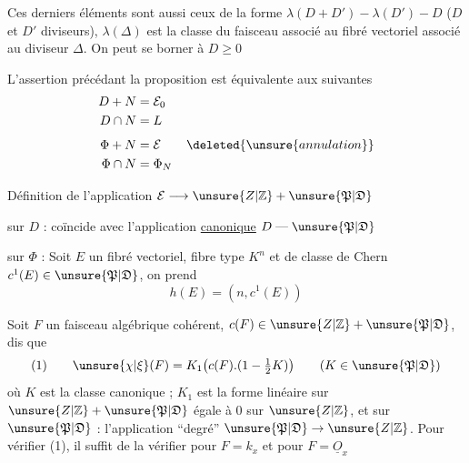 Ces derniers éléments sont aussi ceux de la forme
$\lambda(D+D')-\lambda(D')-D$ 
($D$ et $D'$ diviseurs),
$\lambda(\Delta)$ est la classe du faisceau associé au fibré vectoriel associé au diviseur $\Delta$.
On peut se borner à $D\geq0$



L'assertion précédant la proposition est équivalente aux suivantes
\[
\begin{aligned}
D+N&=\mathcal E_0\\
D\cap N&=L\\[4pt]
\Phi+N&=\mathcal E\qquad\deleted{\unsure{annulation}}\\
\Phi\cap N&=\Phi_N
\end{aligned}
\]

Définition de l'application $\mathcal E\longrightarrow \unsure{Z|\mathbb Z}+\unsure{\mathfrak P|\mathfrak D}$

sur $D$ : coïncide avec l'application \uline{canonique} $D\mathrel{\text{---}}\unsure{\mathfrak P|\mathfrak D}$

sur $\Phi$ : Soit $E$ un fibré vectoriel, fibre type $K^n$ et de classe de Chern
$c^1(E)\in\unsure{\mathfrak P|\mathfrak D}$, on prend
\[
h(E)=(n,c^1(E))
\]

Soit $F$ un faisceau algébrique cohérent, $c(F)\in \unsure{Z|\mathbb Z}+\unsure{\mathfrak P|\mathfrak D}$,
 dis que
\[
(1)\qquad \unsure{\chi|\xi}(F)=K_1\bigl(c(F).(1-\tfrac12 K)\bigr)
\qquad (K\in\unsure{\mathfrak P|\mathfrak D})
\]
où $K$ est la classe canonique ; $K_1$ est la forme linéaire sur
$\unsure{Z|\mathbb Z}+\unsure{\mathfrak P|\mathfrak D}$ égale à $0$ sur $\unsure{Z|\mathbb Z}$, et sur
$\unsure{\mathfrak P|\mathfrak D}$ : l'application ``degré''
$\unsure{\mathfrak P|\mathfrak D}\to \unsure{Z|\mathbb Z}$.
Pour vérifier (1), il suffit de la vérifier pour $F=k_x$ et pour $F=\underline O_x$


